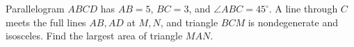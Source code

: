 Parallelogram $ABCD$ has $AB=5$, $BC=3$, and $\angle ABC=45^\circ$. A line through $C$ meets the full lines $AB,AD$ at $M,N$, and triangle $BCM$ is nondegenerate and isosceles. Find the largest area of triangle $MAN$.
